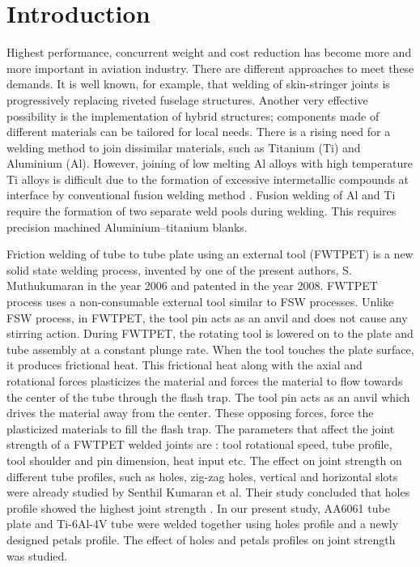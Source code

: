 \documentclass[3p]{elsarticle}
\begin{document}

\linenumbers
								
\section{Introduction}
\label{sec:Introduction}
Highest performance, concurrent weight and cost reduction has become more and more important in aviation industry. There are different approaches to meet these demands. It is well known, for example, that welding of skin-stringer joints is progressively replacing riveted fuselage structures. Another very effective possibility is the implementation of hybrid structures; components made of different materials can be tailored for local needs. There is a rising need for a welding method to join dissimilar materials, such as Titanium (Ti) and Aluminium (Al). However, joining of low melting Al alloys with high temperature Ti alloys is difficult due to the formation of excessive intermetallic compounds at interface by conventional fusion welding method \cite{MadhusudhanReddy2009}. Fusion welding of Al and Ti require the formation of two separate weld pools during welding. This requires precision machined Aluminium–titanium blanks.
\par
Friction welding of tube to tube plate using an external tool (FWTPET) is a new solid state welding process, invented by one of the present authors, S. Muthukumaran in the year 2006 and patented in the year 2008. FWTPET process uses a non-consumable external tool similar to FSW processes. Unlike FSW process, in FWTPET, the tool pin acts as an anvil and does not cause any stirring action. During FWTPET, the rotating tool is lowered on to the plate and tube assembly at a constant plunge rate. When the tool touches the plate surface, it produces frictional heat. This frictional heat along with the axial and rotational forces plasticizes the material and forces the material to flow towards the center of the tube through the flash trap. The tool pin acts as an anvil which drives the material away from the center. These opposing forces, force the plasticized materials to fill the flash trap. The parameters that affect the joint strength of a FWTPET welded joints are : tool rotational speed, tube profile, tool shoulder and pin dimension, heat input etc. The effect on joint strength on different tube profiles, such as holes, zig-zag holes, vertical and horizontal slots were already studied by Senthil Kumaran et al. Their study concluded that holes profile showed the highest joint strength \cite{SenthilKumaran2013}. In our present study, AA6061 tube plate and Ti-6Al-4V tube were welded together using holes profile and a newly designed petals profile. The effect of holes and petals profiles on joint strength was studied. 
\end{document}
